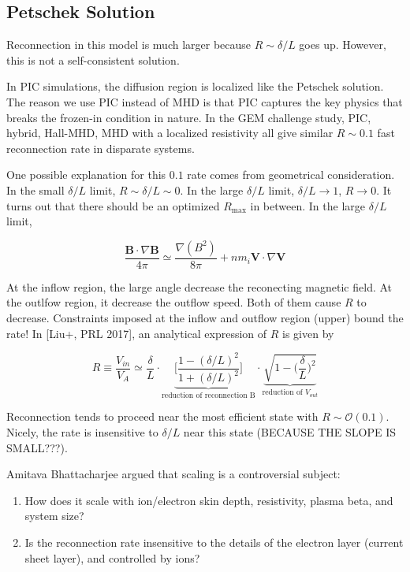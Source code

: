 \documentclass[
  notoc %
]{tufte-book}
\providecommand{\tightlist}{%
  \setlength{\itemsep}{0pt}\setlength{\parskip}{0pt}
}
\begin{document}
\hypertarget{petschek-solution}{%
\subsection{Petschek Solution}\label{petschek-solution}}

Reconnection in this model is much larger because \(R\sim \delta/L\)
goes up. However, this is not a self-consistent solution.

In PIC simulations, the diffusion region is localized like the Petschek
solution. The reason we use PIC instead of MHD is that PIC captures the
key physics that breaks the frozen-in condition in nature. In the GEM
challenge study, PIC, hybrid, Hall-MHD, MHD with a localized resistivity
all give similar \(R\sim 0.1\) fast reconnection rate in disparate
systems.

One possible explanation for this \(0.1\) rate comes from geometrical
consideration. In the small \(\delta/L\) limit, \(R\sim\delta/L\sim0\).
In the large \(\delta/L\) limit, \(\delta/L\rightarrow 1\),
\(R\rightarrow0\). It turns out that there should be an optimized
\(R_{\text{max}}\) in between. In the large \(\delta/L\) limit,

\[
\frac{\mathbf{B}\cdot\nabla\mathbf{B}}{4\pi}\simeq \frac{\nabla(B^2)}{8\pi} + nm_i\mathbf{V}\cdot\nabla\mathbf{V}
\]

At the inflow region, the large angle decrease the reconecting magnetic
field. At the outlfow region, it decrease the outflow speed. Both of
them cause \(R\) to decrease. Constraints imposed at the inflow and
outflow region (upper) bound the rate! In {[}Liu+, PRL 2017{]}, an
analytical expression of \(R\) is given by

\[
R\equiv\frac{V_{in}}{V_A}\simeq \frac{\delta}{L}\cdot \underbrace{\Big[ \frac{1-(\delta/L)^2}{1+(\delta/L)^2} \Big]}_{\text{reduction of reconnection B}}\cdot \underbrace{\sqrt{1-\Big( \frac{\delta}{L} \Big)^2}}_{\text{reduction of }V_{out}}
\]

Reconnection tends to proceed near the most efficient state with
\(R\sim\mathcal{O}(0.1)\). Nicely, the rate is insensitive to
\(\delta/L\) near this state (BECAUSE THE SLOPE IS SMALL???).

Amitava Bhattacharjee argued that scaling is a controversial subject:

\begin{enumerate}
\def\labelenumi{\arabic{enumi}.}
\tightlist
\item
  How does it scale with ion/electron skin depth, resistivity, plasma
  beta, and system size?
\item
  Is the reconnection rate insensitive to the details of the electron
  layer (current sheet layer), and controlled by ions?
\end{enumerate}
\end{document}
